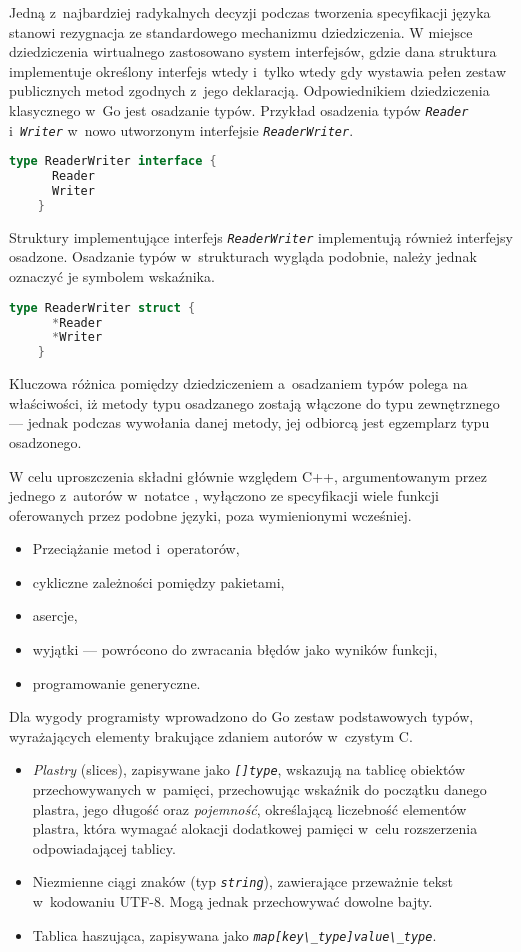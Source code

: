   \par{
  Jedną z~najbardziej radykalnych decyzji podczas tworzenia specyfikacji języka stanowi rezygnacja ze standardowego mechanizmu dziedziczenia. W miejsce dziedziczenia wirtualnego zastosowano system interfejsów, gdzie dana struktura implementuje określony interfejs wtedy i~tylko wtedy gdy wystawia pełen zestaw publicznych metod zgodnych z~jego deklaracją. Odpowiednikiem dziedziczenia klasycznego w~Go jest osadzanie typów.
  Przykład osadzenia typów \textit{\lstinline{Reader}} i~\textit{\lstinline{Writer}} w~nowo utworzonym interfejsie \textit{\lstinline{ReaderWriter}}.
  \begin{lstlisting}[language=go]
    type ReaderWriter interface {
      Reader
      Writer
    }
  \end{lstlisting}
  Struktury implementujące interfejs \textit{\lstinline{ReaderWriter}} implementują również interfejsy osadzone.
  Osadzanie typów w~strukturach wygląda podobnie, należy jednak oznaczyć je symbolem wskaźnika.
  \begin{lstlisting}[language=go]
    type ReaderWriter struct {
      *Reader
      *Writer
    }
  \end{lstlisting}
  Kluczowa różnica pomiędzy dziedziczeniem a~osadzaniem typów polega na właściwości, iż metody typu osadzanego zostają włączone do typu zewnętrznego --- jednak podczas wywołania danej metody, jej odbiorcą jest egzemplarz typu osadzonego. \cite{godoc:embedding}
}
\par {
W celu uproszczenia składni głównie względem C++, argumentowanym przez jednego z~autorów w~notatce \cite{Pike:LessIsMore}, wyłączono ze specyfikacji wiele funkcji oferowanych przez podobne języki, poza wymienionymi wcześniej.
  \begin{itemize}
    \item Przeciążanie metod i~operatorów,
    \item cykliczne zależności pomiędzy pakietami,
    \item asercje,
    \item wyjątki --- powrócono do zwracania błędów jako wyników funkcji,
    \item programowanie generyczne.
  \end{itemize}
}
\par{
  Dla wygody programisty wprowadzono do Go zestaw podstawowych typów, wyrażających elementy brakujące zdaniem autorów w~czystym C.
  \begin{itemize}
    \item \emph{Plastry} (slices), zapisywane jako \textit{\lstinline{[]type}}, wskazują na tablicę obiektów przechowywanych w~pamięci, przechowując wskaźnik do początku danego plastra, jego długość oraz \emph{pojemność}, określającą liczebność elementów plastra, która wymagać alokacji dodatkowej pamięci w~celu rozszerzenia odpowiadającej tablicy.
    \item Niezmienne ciągi znaków (typ \textit{\lstinline{string}}), zawierające przeważnie tekst w~kodowaniu UTF-8. Mogą jednak przechowywać dowolne bajty.
    \item Tablica haszująca, zapisywana jako \textit{\lstinline{map[key\_type]value\_type}}.
  \end{itemize}
}
